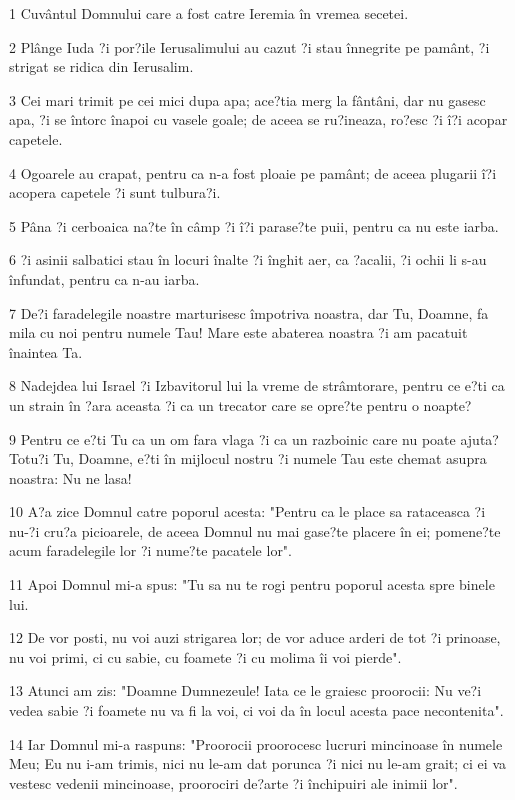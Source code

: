 \par 1 Cuvântul Domnului care a fost catre Ieremia în vremea secetei.
\par 2 Plânge Iuda ?i por?ile Ierusalimului au cazut ?i stau înnegrite pe pamânt, ?i strigat se ridica din Ierusalim.
\par 3 Cei mari trimit pe cei mici dupa apa; ace?tia merg la fântâni, dar nu gasesc apa, ?i se întorc înapoi cu vasele goale; de aceea se ru?ineaza, ro?esc ?i î?i acopar capetele.
\par 4 Ogoarele au crapat, pentru ca n-a fost ploaie pe pamânt; de aceea plugarii î?i acopera capetele ?i sunt tulbura?i.
\par 5 Pâna ?i cerboaica na?te în câmp ?i î?i parase?te puii, pentru ca nu este iarba.
\par 6 ?i asinii salbatici stau în locuri înalte ?i înghit aer, ca ?acalii, ?i ochii li s-au înfundat, pentru ca n-au iarba.
\par 7 De?i faradelegile noastre marturisesc împotriva noastra, dar Tu, Doamne, fa mila cu noi pentru numele Tau! Mare este abaterea noastra ?i am pacatuit înaintea Ta.
\par 8 Nadejdea lui Israel ?i Izbavitorul lui la vreme de strâmtorare, pentru ce e?ti ca un strain în ?ara aceasta ?i ca un trecator care se opre?te pentru o noapte?
\par 9 Pentru ce e?ti Tu ca un om fara vlaga ?i ca un razboinic care nu poate ajuta? Totu?i Tu, Doamne, e?ti în mijlocul nostru ?i numele Tau este chemat asupra noastra: Nu ne lasa!
\par 10 A?a zice Domnul catre poporul acesta: "Pentru ca le place sa rataceasca ?i nu-?i cru?a picioarele, de aceea Domnul nu mai gase?te placere în ei; pomene?te acum faradelegile lor ?i nume?te pacatele lor".
\par 11 Apoi Domnul mi-a spus: "Tu sa nu te rogi pentru poporul acesta spre binele lui.
\par 12 De vor posti, nu voi auzi strigarea lor; de vor aduce arderi de tot ?i prinoase, nu voi primi, ci cu sabie, cu foamete ?i cu molima îi voi pierde".
\par 13 Atunci am zis: "Doamne Dumnezeule! Iata ce le graiesc proorocii: Nu ve?i vedea sabie ?i foamete nu va fi la voi, ci voi da în locul acesta pace necontenita".
\par 14 Iar Domnul mi-a raspuns: "Proorocii proorocesc lucruri mincinoase în numele Meu; Eu nu i-am trimis, nici nu le-am dat porunca ?i nici nu le-am grait; ci ei va vestesc vedenii mincinoase, proorociri de?arte ?i închipuiri ale inimii lor".
